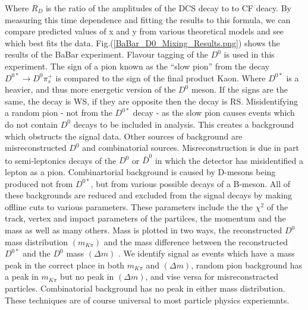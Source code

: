 \noindent Where $R_{D}$ is the ratio of the amplitudes of the DCS decay to to CF deacy. By measuring this time dependence and fitting the results to this formula, we can compare predicted values of x and y from various theoretical models and see which best fits the data. Fig.(\ref{BaBar_D0_Mixing_Results.png}) shows the results of the BaBar experiment. Flavour tagging of the $D^{0}$ is used in this experiment. The sign of a pion known as the ``slow pion'' from the decay $D^{0*} \rightarrow D^{0} \pi^{+}_{s}$ is compared to the sign of the final product Kaon. Where $D^{0*}$ is a heavier, and thus more energetic version of the $D^{0}$ meson. If the signs are the same, the decay is WS, if they are opposite then the decay is RS. Misidentifying a random pion - not from the $D^{0*}$ decay - as the slow pion causes events which do not contain $D^{0}$ decays to be included in analysis. This creates a background which obstructs the signal data. Other sources of background are misreconstructed $D^{0}$ and combinatorial sources. Misreconstruction is due in part to semi-leptonics decays of the $D^{0}$ or $\bar{D}^{0}$ in which the detector has misidentified a lepton as a pion. Combinartorial background is caused by D-mesons being produced not from $D^{0*}$, but from various possible decays of a B-meson. All of these backgrounds are reduced and excluded from the signal decays by making offline cuts to various parameters. These parameters include the the $\chi^{2}$ of the track, vertex and impact parameters of the partilces, the momentum and the mass as well as many others. Mass is plotted in two ways, the reconstructed $D^{0}$ mass distribution $(m_{K \pi})$ and the mass difference between the reconstructed $D^{0*}$ and the $D^{0}$ mass $(\Delta m)$ \cite{Kevin}. We identify signal as events which have a mass peak in the correct place in both $m_{K \pi}$ and $(\Delta m)$, random pion background has a peak in $m_{K \pi}$ but no peak in $(\Delta m)$, and vise versa for misreconstracted particles. Combinatorial background has no peak in either mass distribution. These techniques are of course universal to most particle physics experiemnts. 

